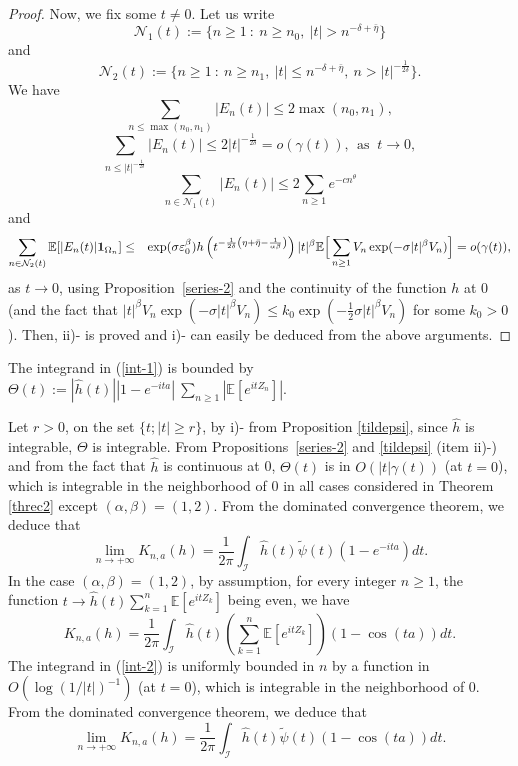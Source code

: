 \documentclass[oneside, a4paper,11pt,reqno]{amsart}
\begin{document}
\begin{proof}
\noindent Now, we fix some $t\ne 0$.
Let us write 
$${\mathcal N}_1(t):=\{n\ge 1\ :\ n\ge n_0,\ |t|>n^{-\delta+\bar\eta}\}$$
and
$${\mathcal N}_2(t):=\{n\ge 1\ :\ n\ge n_1,\ |t|\leq n^{-\delta+\bar\eta},\  n>  
|t|^{-\frac 1{2\delta} }\}.$$
We have
$$\sum_{n\le \max(n_0,n_1)} |E_n(t)| \le 2 \max(n_0,n_1), $$
$$\sum_{n\le |t|^{-\frac 1{2\delta} } } |E_n(t)| \le 2 |t|^{-\frac 1{2\delta} } =
 o(\gamma(t)), \ \ \mbox{as }\ t\rightarrow 0, $$
$$\sum_{n\in{\mathcal N}_1(t)}|E_n(t)|\le
       2 \sum_{n\ge 1} e^{-cn^\theta}$$
and
\begin{eqnarray*}
\sum_{n\in{\mathcal N}_2(t)}  \mathbb{E} [|E_n(t)| \mbox{\bf 1}_{\Omega_n} ]  &\le &
    \exp(\sigma\varepsilon_0^{\beta})    h\left(t^{ -\frac 1{2\delta}\left(\eta+\bar\eta-\frac 1{\alpha\beta}  \right)}  \right) |t|^\beta
  \mathbb{E}  \Big[ \sum_{n\ge 1} V_n  \exp(-\sigma|t|^\beta V_n)\Big]  =  
o(\gamma(t)),
    \end{eqnarray*}
as $t\rightarrow 0$, using Proposition~\ref{series-2} and the continuity of 
the function $h$ at 0 (and the fact that 
$|t|^\beta V_n\exp(-\sigma|t|^\beta V_n)\le k_0 \exp(-\frac 1 2 \sigma|t|^\beta V_n)$
for some $k_0>0$). 
Then, ii)- is proved and i)- can easily be deduced 
from the above arguments.
\end{proof}

The integrand in (\ref{int-1}) is bounded by 
$\Theta(t):= |\hat{h} (t)|  |1-e^{-ita}|\ \sum_{n\geq 1}  | {\mathbb E}[e^{itZ_n}] | $.

Let $r>0$, on the set $\{t;  |t| \geq r\}$, by i)- from Proposition \ref{tildepsi}, since $\hat{h}$ is integrable, $\Theta$ is 
integrable. From Propositions~\ref{series-2} and \ref{tildepsi} (item ii)-) and from 
the fact that $\hat{h}$ is continuous at 0,  
$\Theta(t)$ is in $O\left(|t| \gamma(t)\right)$ (at $t=0$), which is integrable in the 
neighborhood of 0 in all cases considered in Theorem \ref{threc2} except $(\alpha,\beta)=(1,2)$. From the dominated convergence theorem, we deduce that 
\begin{equation}\label{ControleKna}
\lim_{n\rightarrow +\infty} K_{n,a}(h) =\frac{1}{2\pi} \int_{\mathcal I} 
\hat{h} (t) \tilde\psi(t) \left( 1- e^{-ita} \right) dt.
\end{equation}
In the case $(\alpha,\beta)=(1,2)$, by assumption, for every integer $n\ge 1$, 
the function $t\rightarrow \hat{h}(t) \sum_{k=1}^n \mathbb{E} [e^{i t Z_k} ] $  being even, we have
 \begin{equation}\label{int-2} 
K_{n,a}(h)= \frac{1}{2\pi} \int_{\mathcal I} \hat{h} (t) \left(\sum_{k=1}^n \mathbb{E} [e^{i t Z_k} ] \right) \left( 1- \cos(ta) \right) dt.
\end{equation}
The integrand in (\ref{int-2}) is uniformly bounded in $n$ by a function in $O\left( \log(1/|t| )^{-1} \right)$ (at $t=0$), which is integrable in the neighborhood of 0. From the dominated convergence theorem, we deduce that 
\begin{equation}\label{ControleKna2}
\lim_{n\rightarrow +\infty} K_{n,a}(h) =\frac{1}{2\pi} \int_{\mathcal I} 
\hat{h} (t) \tilde\psi(t) \left( 1- \cos(ta) \right) dt.
\end{equation}
\end{document}
